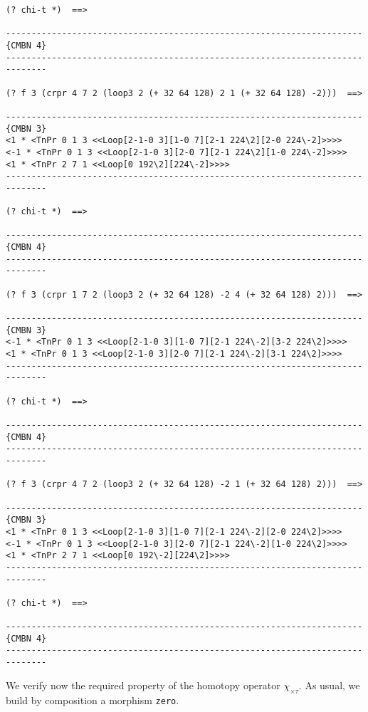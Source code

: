 {\begin{verbatim}
(? chi-t *)  ==>

----------------------------------------------------------------------{CMBN 4}
------------------------------------------------------------------------------

(? f 3 (crpr 4 7 2 (loop3 2 (+ 32 64 128) 2 1 (+ 32 64 128) -2)))  ==>

----------------------------------------------------------------------{CMBN 3}
<1 * <TnPr 0 1 3 <<Loop[2-1-0 3][1-0 7][2-1 224\2][2-0 224\-2]>>>>
<-1 * <TnPr 0 1 3 <<Loop[2-1-0 3][2-0 7][2-1 224\2][1-0 224\-2]>>>>
<1 * <TnPr 2 7 1 <<Loop[0 192\2][224\-2]>>>>
------------------------------------------------------------------------------

(? chi-t *)  ==>

----------------------------------------------------------------------{CMBN 4}
------------------------------------------------------------------------------

(? f 3 (crpr 1 7 2 (loop3 2 (+ 32 64 128) -2 4 (+ 32 64 128) 2)))  ==>

----------------------------------------------------------------------{CMBN 3}
<-1 * <TnPr 0 1 3 <<Loop[2-1-0 3][1-0 7][2-1 224\-2][3-2 224\2]>>>>
<1 * <TnPr 0 1 3 <<Loop[2-1-0 3][2-0 7][2-1 224\-2][3-1 224\2]>>>>
------------------------------------------------------------------------------

(? chi-t *)  ==>

----------------------------------------------------------------------{CMBN 4}
------------------------------------------------------------------------------

(? f 3 (crpr 4 7 2 (loop3 2 (+ 32 64 128) -2 1 (+ 32 64 128) 2)))  ==>

----------------------------------------------------------------------{CMBN 3}
<1 * <TnPr 0 1 3 <<Loop[2-1-0 3][1-0 7][2-1 224\-2][2-0 224\2]>>>>
<-1 * <TnPr 0 1 3 <<Loop[2-1-0 3][2-0 7][2-1 224\-2][1-0 224\2]>>>>
<1 * <TnPr 2 7 1 <<Loop[0 192\-2][224\2]>>>>
------------------------------------------------------------------------------

(? chi-t *)  ==>

----------------------------------------------------------------------{CMBN 4}
------------------------------------------------------------------------------
\end{verbatim}}
We verify now
the required property of the homotopy operator $\chi_{\times\tau}$. As usual, we build
by composition a morphism {\tt zero}. 
